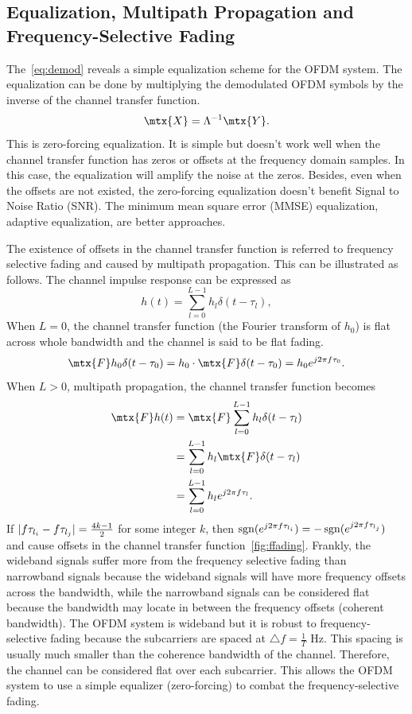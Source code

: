 \subsection{Equalization, Multipath Propagation and Frequency-Selective Fading}
The~\cref{eq:demod} reveals a simple equalization scheme for the OFDM system. The equalization can be done by multiplying the demodulated OFDM symbols by the inverse of the channel transfer function.
\begin{equation}
    \mtx{X} = \Lambda^{-1}\mtx{Y}.
\end{equation}
This is zero-forcing equalization. It is simple but doesn't work well when the channel transfer function has zeros or offsets at the frequency domain samples. In this case, the equalization will amplify the noise at the zeros. Besides, even when the offsets are not existed, the zero-forcing equalization doesn't benefit Signal to Noise Ratio (SNR). The minimum mean square error (MMSE) equalization, adaptive equalization, \etc are better approaches.

The existence of offsets in the channel transfer function is referred to frequency selective fading and caused by multipath propagation. This can be illustrated as follows. The channel impulse response can be expressed as
\begin{equation}
    h(t) = \sum_{l=0}^{L-1}h_l\delta(t-\tau_l),
\end{equation}
When $L=0$, the channel transfer function (the Fourier transform of $h_0$) is flat across whole bandwidth and the channel is said to be flat fading.
\begin{equation}
    \mtx{F}h_0\delta(t-\tau_0) = h_0\cdot\mtx{F}\delta(t-\tau_0) = h_0 e^{j2\pi f\tau_0}.
\end{equation}
When $L>0$, \aka multipath propagation, the channel transfer function becomes
\begin{equation}
    \begin{aligned}
        \mtx{F}h(t)
        &= \mtx{F}\sum_{l=0}^{L-1}h_l\delta(t-\tau_l) \\
        &= \sum_{l=0}^{L-1}h_l\mtx{F}\delta(t-\tau_l) \\
        &= \sum_{l=0}^{L-1}h_l e^{j2\pi f\tau_l}.
    \end{aligned}
\end{equation}
If $\lvert f\tau_{l_i}-f\tau_{l_j}\rvert=\frac{4k-1}{2}$ for some integer $k$, then $\operatorname{\mathrm{sgn}}(e^{j2\pi f\tau_{l_i}})=-\operatorname{\mathrm{sgn}}(e^{j2\pi f\tau_{l_j}})$ and cause offsets in the channel transfer function~\cref{fig:ffading}. Frankly, the wideband signals suffer more from the frequency selective fading than narrowband signals because the wideband signals will have more frequency offsets across the bandwidth, while the narrowband signals can be considered flat because the bandwidth may locate in between the frequency offsets (\aka coherent bandwidth). The OFDM system is wideband but it is robust to frequency-selective fading because the subcarriers are spaced at $\triangle f=\frac{1}{T}$ Hz. This spacing is usually much smaller than the coherence bandwidth of the channel. Therefore, the channel can be considered flat over each subcarrier. This allows the OFDM system to use a simple equalizer (\ie zero-forcing) to combat the frequency-selective fading.

